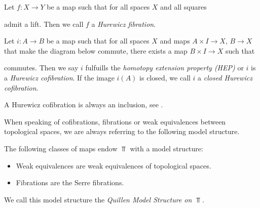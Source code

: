 \begin{definition}
    Let $f\colon X\to Y$ be a map such that for all spaces $X$ and all squares
    \begin{center}
    \end{center}
    admit a lift.
    Then we call $f$ a \emph{Hurewicz fibration}.
\end{definition}
\begin{definition}
    Let $i\colon A\to B$ be a map such that for all spaces $X$ and maps $A\times I\to X$, $B\to X$ that make the diagram below commute, there exists a map $B\times I\to X$ such that
    \begin{center}
    \end{center}
    commutes.
    Then we say $i$ fulfuills the \emph{homotopy extension property (HEP)} or $i$ is a \emph{Hurewicz cofibration}.
    If the image $i(A)$ is closed, we call $i$ a \emph{closed Hurewicz cofibration}.
\end{definition}
\begin{remark}
    A Hurewicz cofibration is always an inclusion, see \cite[Proposition 4H.1]{hatcher2002algebraic}.
\end{remark}
When speaking of cofibrations, fibrations or weak equivalences between topological spaces, we are always referring to the following model structure.
\begin{prop}
    The following classes of maps endow $\Top$ with a model structure:
    \begin{itemize}
        \item Weak equivalences are weak equivalences of topological spaces. %
        \item Fibrations are the Serre fibrations.
    \end{itemize}
    We call this model structure the \emph{Quillen Model Structure on $\Top$}.
    \begin{reference}
        \cite[Chap. II, \S 3, Theorem 1]{Quillen1967}
    \end{reference}
\end{prop}
